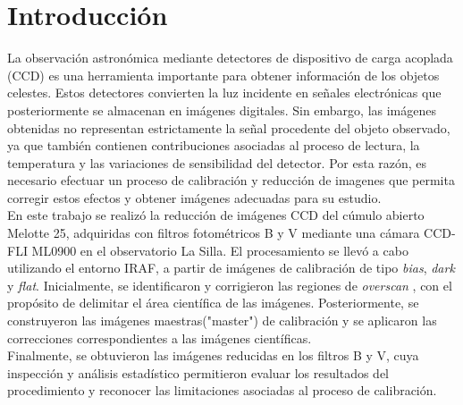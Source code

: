 \documentclass[10pt,a4paper,twocolumn]{article}
\begin{document}

\section{Introducción}
La observación astronómica mediante detectores de dispositivo de carga acoplada (CCD) es una herramienta importante  para obtener información de los objetos celestes. Estos detectores convierten la luz incidente en señales electrónicas que posteriormente se almacenan en imágenes digitales. Sin embargo, las imágenes obtenidas no representan estrictamente la señal procedente del objeto observado, ya que también contienen contribuciones asociadas al  proceso de lectura, la temperatura y las variaciones de sensibilidad del detector. Por esta razón, es necesario efectuar un proceso de calibración y reducción de imagenes  que permita corregir estos efectos y obtener imágenes adecuadas para su estudio.\\

En este trabajo se realizó la reducción de imágenes CCD del cúmulo abierto Melotte 25, adquiridas con  filtros fotométricos B y V mediante una cámara CCD-FLI ML0900 en el observatorio La Silla. El procesamiento se llevó a cabo utilizando el entorno IRAF, a partir de imágenes de calibración de tipo \textit{bias}, \textit{dark} y \textit{flat}. Inicialmente, se identificaron y corrigieron las regiones de \textit{overscan} , con el propósito de delimitar el área científica de las imágenes. Posteriormente, se construyeron las imágenes maestras("master") de calibración y se aplicaron las correcciones correspondientes a las imágenes científicas.\\

Finalmente, se obtuvieron las imágenes reducidas en los filtros B y V, cuya inspección y análisis estadístico permitieron evaluar los resultados del procedimiento y reconocer las limitaciones asociadas al proceso de calibración.\\
\end{document}
